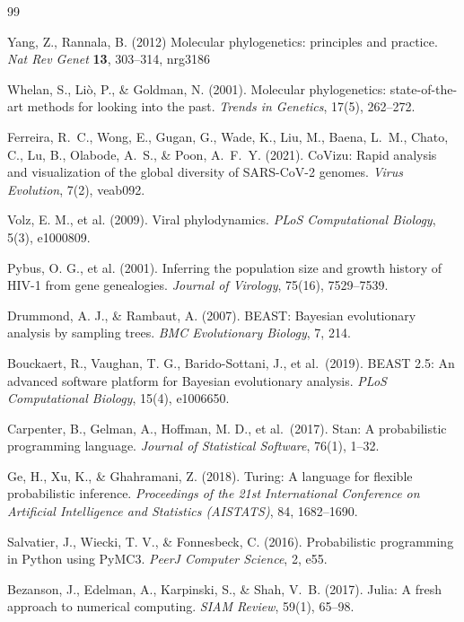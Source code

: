 \documentclass[11pt, a4paper]{article}
\begin{document}
\begin{thebibliography}{99}

Yang, Z., Rannala, B. (2012) Molecular phylogenetics: principles and practice. 
\textit{Nat Rev Genet} \textbf{13}, 303--314, nrg3186

Whelan, S., Liò, P., \& Goldman, N. (2001).
Molecular phylogenetics: state-of-the-art methods for looking into the past.
\textit{Trends in Genetics}, 17(5), 262--272.

Ferreira, R.~C., Wong, E., Gugan, G., Wade, K., Liu, M., Baena, L.~M., Chato, C., Lu, B., Olabode, A.~S., \& Poon, A.~F.~Y. (2021).
CoVizu: Rapid analysis and visualization of the global diversity of SARS-CoV-2 genomes.
\textit{Virus Evolution}, 7(2), veab092.

Volz, E. M., et al. (2009).
Viral phylodynamics.
\textit{PLoS Computational Biology}, 5(3), e1000809.

Pybus, O. G., et al. (2001).
Inferring the population size and growth history of HIV-1 from gene genealogies.
\textit{Journal of Virology}, 75(16), 7529--7539.

Drummond, A. J., \& Rambaut, A. (2007).
BEAST: Bayesian evolutionary analysis by sampling trees.
\textit{BMC Evolutionary Biology}, 7, 214.

Bouckaert, R., Vaughan, T. G., Barido-Sottani, J., et al.\ (2019).
BEAST 2.5: An advanced software platform for Bayesian evolutionary analysis.
\textit{PLoS Computational Biology}, 15(4), e1006650.

Carpenter, B., Gelman, A., Hoffman, M. D., et al.\ (2017).
Stan: A probabilistic programming language.
\textit{Journal of Statistical Software}, 76(1), 1--32.

Ge, H., Xu, K., \& Ghahramani, Z. (2018).
Turing: A language for flexible probabilistic inference.
\textit{Proceedings of the 21st International Conference on Artificial Intelligence and Statistics (AISTATS)}, 84, 1682--1690.

Salvatier, J., Wiecki, T. V., \& Fonnesbeck, C. (2016).
Probabilistic programming in Python using PyMC3.
\textit{PeerJ Computer Science}, 2, e55.

Bezanson, J., Edelman, A., Karpinski, S., \& Shah, V.~B. (2017).
Julia: A fresh approach to numerical computing.
\textit{SIAM Review}, 59(1), 65--98.


\end{thebibliography}
\end{document}
